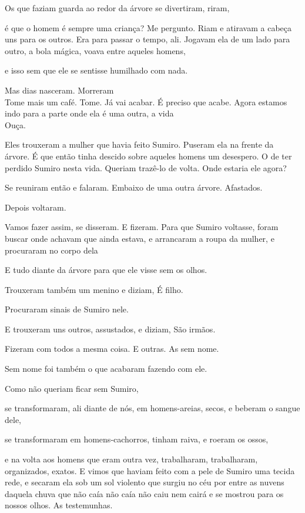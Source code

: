 Os que faziam guarda ao redor da árvore se divertiram, riram,

é que o homem é sempre uma criança? Me pergunto. Riam e atiravam a
cabeça uns para os outros. Era para passar o tempo, ali. Jogavam ela de
um lado para outro, a bola mágica, voava entre aqueles homens,

e isso sem que ele se sentisse humilhado com nada.

Mas dias nasceram. Morreram\\

Tome mais um café. Tome. Já vai acabar. É preciso que acabe. Agora
estamos indo para a parte onde ela é uma outra, a vida\\

Ouça.

Eles trouxeram a mulher que havia feito Sumiro. Puseram ela na frente da
árvore. É que então tinha descido sobre aqueles homens um desespero. O
de ter perdido Sumiro nesta vida. Queriam trazê-lo de volta. Onde
estaria ele agora?

Se reuniram então e falaram. Embaixo de uma outra árvore. Afastados.

Depois voltaram.

Vamos fazer assim, se disseram. E fizeram. Para que Sumiro voltasse,
foram buscar onde achavam que ainda estava, e arrancaram a roupa da
mulher, e procuraram no corpo dela

E tudo diante da árvore para que ele visse sem os olhos.

Trouxeram também um menino e diziam, É filho.

Procuraram sinais de Sumiro nele.

E trouxeram uns outros, assustados, e diziam, São irmãos.

Fizeram com todos a mesma coisa. E outras. As sem nome.

Sem nome foi também o que acabaram fazendo com ele.

Como não queriam ficar sem Sumiro,

se transformaram, ali diante de nós, em homens-areias, secos, e beberam
o sangue dele,

se transformaram em homens-cachorros, tinham raiva, e roeram os ossos,

e na volta aos homens que eram outra vez, trabalharam, trabalharam,
organizados, exatos. E vimos que haviam feito com a pele de Sumiro uma
tecida rede, e secaram ela sob um sol violento que surgiu no céu por
entre as nuvens daquela chuva que não caía não caía não caiu nem cairá e
se mostrou para os nossos olhos. As testemunhas.\\

